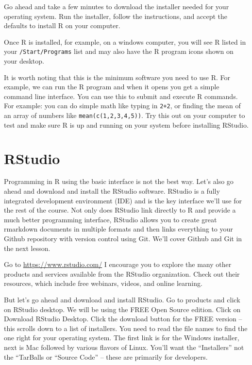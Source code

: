 \documentclass[
]{book}
\begin{document}
Go ahead and take a few minutes to download the installer needed for your operating system. Run the installer, follow the instructions, and accept the defaults to install R on your computer.

Once R is installed, for example, on a windows computer, you will see R listed in your \texttt{/Start/Programs} list and may also have the R program icons shown on your desktop.

It is worth noting that this is the minimum software you need to use R. For example, we can run the R program and when it opens you get a simple command line interface. You can use this to submit and execute R commands. For example: you can do simple math like typing in \texttt{2+2}, or finding the mean of an array of numbers like \texttt{mean(c(1,2,3,4,5))}. Try this out on your computer to test and make sure R is up and running on your system before installing RStudio.

\hypertarget{rstudio}{%
\section{RStudio}\label{rstudio}}

Programming in R using the basic interface is not the best way. Let's also go ahead and download and install the RStudio software. RStudio is a fully integrated development environment (IDE) and is the key interface we'll use for the rest of the course. Not only does RStudio link directly to R and provide a much better programming interface, RStudio allows you to create great rmarkdown documents in multiple formats and then links everything to your Github repository with version control using Git. We'll cover Github and Git in the next lesson.

Go to \url{https://www.rstudio.com/} I encourage you to explore the many other products and services available from the RStudio organization. Check out their resources, which include free webinars, videos, and online learning.

But let's go ahead and download and install RStudio. Go to products and click on RStudio desktop. We will be using the FREE Open Source edition. Click on Download RStudio Desktop. Click the download button for the FREE version -- this scrolls down to a list of installers. You need to read the file names to find the one right for your operating system. The first link is for the Windows installer, next is Mac followed by various flavors of Linux. You'll want the ``Installers'' not the ``TarBalls or ``Source Code'' -- these are primarily for developers.
\end{document}

